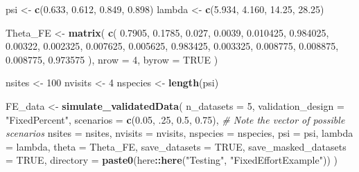 \documentclass[
]{article}
\newenvironment{Shaded}{\begin{snugshade}}{\end{snugshade}}
\newcommand{\AttributeTok}[1]{\textcolor[rgb]{0.13,0.29,0.53}{#1}}
\newcommand{\CommentTok}[1]{\textcolor[rgb]{0.56,0.35,0.01}{\textit{#1}}}
\newcommand{\ConstantTok}[1]{\textcolor[rgb]{0.56,0.35,0.01}{#1}}
\newcommand{\DecValTok}[1]{\textcolor[rgb]{0.00,0.00,0.81}{#1}}
\newcommand{\FloatTok}[1]{\textcolor[rgb]{0.00,0.00,0.81}{#1}}
\newcommand{\FunctionTok}[1]{\textcolor[rgb]{0.13,0.29,0.53}{\textbf{#1}}}
\newcommand{\NormalTok}[1]{#1}
\newcommand{\OtherTok}[1]{\textcolor[rgb]{0.56,0.35,0.01}{#1}}
\newcommand{\SpecialCharTok}[1]{\textcolor[rgb]{0.81,0.36,0.00}{\textbf{#1}}}
\newcommand{\StringTok}[1]{\textcolor[rgb]{0.31,0.60,0.02}{#1}}
\begin{document}
\begin{Shaded}
\begin{Highlighting}[]
\NormalTok{psi }\OtherTok{\textless{}{-}} \FunctionTok{c}\NormalTok{(}\FloatTok{0.633}\NormalTok{, }\FloatTok{0.612}\NormalTok{, }\FloatTok{0.849}\NormalTok{, }\FloatTok{0.898}\NormalTok{)}
\NormalTok{lambda }\OtherTok{\textless{}{-}} \FunctionTok{c}\NormalTok{(}\FloatTok{5.934}\NormalTok{, }\FloatTok{4.160}\NormalTok{, }\FloatTok{14.25}\NormalTok{, }\FloatTok{28.25}\NormalTok{)}

\NormalTok{Theta\_FE }\OtherTok{\textless{}{-}} \FunctionTok{matrix}\NormalTok{(}
  \FunctionTok{c}\NormalTok{(}
    \FloatTok{0.7905}\NormalTok{, }\FloatTok{0.1785}\NormalTok{, }\FloatTok{0.027}\NormalTok{, }\FloatTok{0.0039}\NormalTok{, }
    \FloatTok{0.010425}\NormalTok{, }\FloatTok{0.984025}\NormalTok{, }\FloatTok{0.00322}\NormalTok{, }\FloatTok{0.002325}\NormalTok{, }
    \FloatTok{0.007625}\NormalTok{, }\FloatTok{0.005625}\NormalTok{, }\FloatTok{0.983425}\NormalTok{, }\FloatTok{0.003325}\NormalTok{,}
    \FloatTok{0.008775}\NormalTok{, }\FloatTok{0.008875}\NormalTok{, }\FloatTok{0.008775}\NormalTok{, }\FloatTok{0.973575}
\NormalTok{  ), }
  \AttributeTok{nrow =} \DecValTok{4}\NormalTok{, }
  \AttributeTok{byrow =} \ConstantTok{TRUE}
\NormalTok{)}

\NormalTok{nsites }\OtherTok{\textless{}{-}} \DecValTok{100}
\NormalTok{nvisits }\OtherTok{\textless{}{-}} \DecValTok{4}
\NormalTok{nspecies }\OtherTok{\textless{}{-}} \FunctionTok{length}\NormalTok{(psi)}

\NormalTok{FE\_data }\OtherTok{\textless{}{-}} \FunctionTok{simulate\_validatedData}\NormalTok{(}
  \AttributeTok{n\_datasets =} \DecValTok{5}\NormalTok{, }
  \AttributeTok{validation\_design =} \StringTok{"FixedPercent"}\NormalTok{,}
  \AttributeTok{scenarios =} \FunctionTok{c}\NormalTok{(}\FloatTok{0.05}\NormalTok{, .}\DecValTok{25}\NormalTok{,  }\FloatTok{0.5}\NormalTok{, }\FloatTok{0.75}\NormalTok{), }\CommentTok{\# Note the vector of possible scenarios}
  \AttributeTok{nsites =}\NormalTok{ nsites, }
  \AttributeTok{nvisits =}\NormalTok{ nvisits, }
  \AttributeTok{nspecies =}\NormalTok{ nspecies,}
  \AttributeTok{psi =}\NormalTok{ psi, }
  \AttributeTok{lambda =}\NormalTok{ lambda,}
  \AttributeTok{theta =}\NormalTok{ Theta\_FE, }
  \AttributeTok{save\_datasets =} \ConstantTok{TRUE}\NormalTok{,}
  \AttributeTok{save\_masked\_datasets =} \ConstantTok{TRUE}\NormalTok{,}
  \AttributeTok{directory =} \FunctionTok{paste0}\NormalTok{(here}\SpecialCharTok{::}\FunctionTok{here}\NormalTok{(}\StringTok{"Testing"}\NormalTok{, }\StringTok{"FixedEffortExample"}\NormalTok{))}
\NormalTok{)}
\end{Highlighting}
\end{Shaded}
\end{document}
